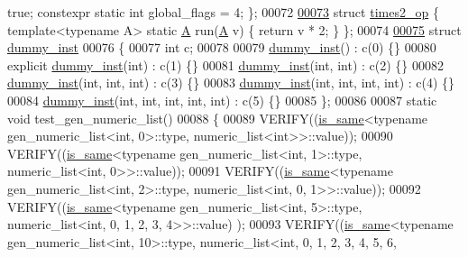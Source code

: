 \begin{DoxyCode}
{      true};  constexpr \textcolor{keyword}{static} \textcolor{keywordtype}{int} global\_flags = 4; \};
00072 
\hyperlink{structtimes2__op}{00073} \textcolor{keyword}{struct }\hyperlink{structtimes2__op}{times2\_op} \{ \textcolor{keyword}{template}<\textcolor{keyword}{typename} A> \textcolor{keyword}{static} \hyperlink{group___core___module_class_eigen_1_1_matrix}{A} run(\hyperlink{group___core___module_class_eigen_1_1_matrix}{A} v) \{ \textcolor{keywordflow}{return} v * 2; \} \};
00074 
\hyperlink{structdummy__inst}{00075} \textcolor{keyword}{struct }\hyperlink{structdummy__inst}{dummy\_inst}
00076 \{
00077   \textcolor{keywordtype}{int} c;
00078 
00079   \hyperlink{structdummy__inst}{dummy\_inst}() : c(0) \{\}
00080   \textcolor{keyword}{explicit} \hyperlink{structdummy__inst}{dummy\_inst}(\textcolor{keywordtype}{int}) : c(1) \{\}
00081   \hyperlink{structdummy__inst}{dummy\_inst}(\textcolor{keywordtype}{int}, \textcolor{keywordtype}{int}) : c(2) \{\}
00082   \hyperlink{structdummy__inst}{dummy\_inst}(\textcolor{keywordtype}{int}, \textcolor{keywordtype}{int}, \textcolor{keywordtype}{int}) : c(3) \{\}
00083   \hyperlink{structdummy__inst}{dummy\_inst}(\textcolor{keywordtype}{int}, \textcolor{keywordtype}{int}, \textcolor{keywordtype}{int}, \textcolor{keywordtype}{int}) : c(4) \{\}
00084   \hyperlink{structdummy__inst}{dummy\_inst}(\textcolor{keywordtype}{int}, \textcolor{keywordtype}{int}, \textcolor{keywordtype}{int}, \textcolor{keywordtype}{int}, \textcolor{keywordtype}{int}) : c(5) \{\}
00085 \};
00086 
00087 \textcolor{keyword}{static} \textcolor{keywordtype}{void} test\_gen\_numeric\_list()
00088 \{
00089   VERIFY((\hyperlink{struct_eigen_1_1internal_1_1is__same}{is\_same}<\textcolor{keyword}{typename} gen\_numeric\_list<int, 0>::type, numeric\_list<int>>::value));
00090   VERIFY((\hyperlink{struct_eigen_1_1internal_1_1is__same}{is\_same}<\textcolor{keyword}{typename} gen\_numeric\_list<int, 1>::type, numeric\_list<int, 0>>::value));
00091   VERIFY((\hyperlink{struct_eigen_1_1internal_1_1is__same}{is\_same}<\textcolor{keyword}{typename} gen\_numeric\_list<int, 2>::type, numeric\_list<int, 0, 1>>::value));
00092   VERIFY((\hyperlink{struct_eigen_1_1internal_1_1is__same}{is\_same}<\textcolor{keyword}{typename} gen\_numeric\_list<int, 5>::type, numeric\_list<int, 0, 1, 2, 3, 4>>::value)
      );
00093   VERIFY((\hyperlink{struct_eigen_1_1internal_1_1is__same}{is\_same}<\textcolor{keyword}{typename} gen\_numeric\_list<int, 10>::type, numeric\_list<int, 0, 1, 2, 3, 4, 5, 6,

\end{DoxyCode}
